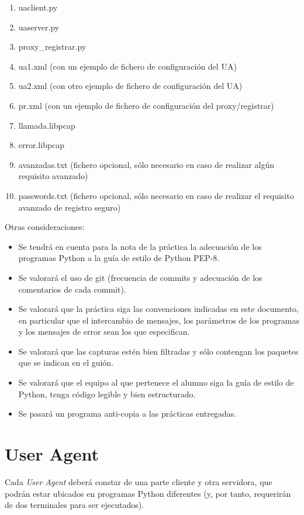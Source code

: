 \documentclass[a4paper,11pt]{article}
\begin{document}
\begin{enumerate}
  \item uaclient.py
  \item uaserver.py
  \item proxy\_registrar.py
  \item ua1.xml (con un ejemplo de fichero de configuración del UA)
  \item ua2.xml (con otro ejemplo de fichero de configuración del UA)
  \item pr.xml (con un ejemplo de fichero de configuración del proxy/registrar)
  \item llamada.libpcap
  \item error.libpcap
  \item avanzadas.txt (fichero opcional, sólo necesario en caso de realizar algún requisito avanzado)
  \item passwords.txt (fichero opcional, sólo necesario en caso de realizar el requisito avanzado de registro seguro)
\end{enumerate}

Otras consideraciones:
\begin{itemize}
  \item Se tendrá en cuenta para la nota de la práctica la adecuación de los
programas Python a la guía de estilo de Python PEP-8.
  \item Se valorará el uso de git (frecuencia de commits y adecuación de los comentarios de cada commit).
  \item Se valorará que la práctica siga las
convenciones indicadas en este documento, en particular que el intercambio
de mensajes, los parámetros de los programas y los mensajes de error sean los
que especifican.
  \item Se valorará que las capturas estén bien filtradas y sólo contengan los paquetes que se indican en el guión.
  \item Se valorará que el equipo al que pertenece el alumno siga la guía de estilo
de Python, tenga código legible y bien estructurado.
  \item Se pasará un programa anti-copia a las prácticas entregadas.
\end{itemize}


\section{User Agent}

Cada \emph{User Agent} deberá constar de una parte cliente y otra servidora, que podrán estar ubicados en programas Python diferentes (y, por tanto, requerirán de dos terminales para ser ejecutados).
\end{document}
